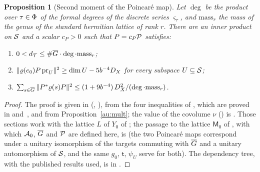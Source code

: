\documentclass[10pt]{amsart}
\newtheorem{proposition}[theorem]{Proposition}
\theoremstyle{definition}
\theoremstyle{remark}
\begin{document}
\begin{proposition}[Second moment of the Poincar\'e map]\label{au:moment}
Let $\deg$ be the product over $\tau\in\Phi$ of the formal degrees of the discrete series
$\varsigma_\tau$, and $\mathrm{mass}_r$ the mass of the genus of the standard hermitian lattice of
rank $r$. There are an inner product on $\mathcal S$ and a scalar $c_P>0$ such that $P=c_P\mathcal P$
satisfies:
\begin{enumerate}
\item[(i)] $0<d_{\mathcal T}\le\#\overline G\cdot\deg\cdot\mathrm{mass}_r$;
\item[(ii)] $\|\varrho(e_0)P\,\mathrm{pr}_U\|^2\ge\dim U-5b^{-4}D_X$ for every subspace
$U\subseteq\mathcal S$;
\item[(iii)] $\sum_{s\in\overline G}\|P^*\varrho(s)P\|^2\le(1+9b^{-4})\,D_X^2/(\deg\cdot
\mathrm{mass}_r)$.
\end{enumerate}
\end{proposition}
\begin{proof}
The proof is given in {\cite[\S2]{P51}} ({\cite[Theorem~2.15]{P51}}, {\cite[Propositions~2.10, 2.12 and~2.13]{P51}}), from the four inequalities of {\cite[Theorem~2.4]{P51}}, which are proved in
{\cite[\S\S2--3.3 and~5--8.4]{P51}} and~{\cite[\S\S2--6]{P52}}, and from
Proposition~\ref{au:mult}; the value of the covolume $\nu$ ({\cite[Lemma~2.18]{P51}})
is {\cite[Theorem~3.12]{P51}}. Those sections work with the lattice $L$ of $Y_0$ of
{\cite[\S2.1]{P51}}; the passage to the lattice $\mathsf M_0$ of {\cite[(35)]{P49}}, with
which $\mathcal A_0$, $\overline G$ and $\mathcal P$ are defined here, is {\cite[Lemma~2.14]{P51}} (the two Poincar\'e
maps correspond under a unitary isomorphism of the targets commuting with $\overline G$ and a unitary
automorphism of $\mathcal S$, and the same $g_0$, $\mathsf t$, $\psi_U$ serve for both). The dependency tree, with the published results used, is in
{\cite[\S2.8]{P51}}.
\end{proof}
\end{document}

